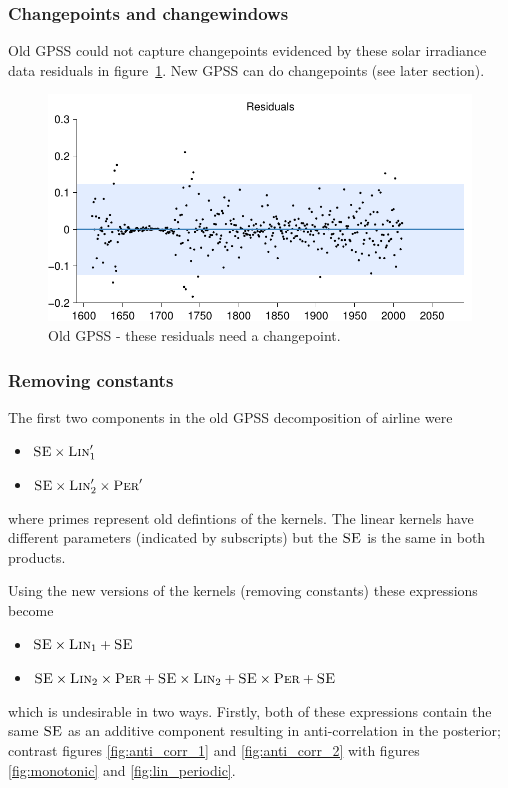 \documentclass{article}
\begin{document}
\subsubsection{Changepoints and changewindows}

Old GPSS could not capture changepoints evidenced by these solar irradiance data residuals in figure~\ref{fig:not_cp}.
New GPSS can do changepoints (see later section).

\begin{figure}[h]
\centering
\includegraphics[width=0.98\columnwidth]{figures/old-gpss/02-solar-s_resid}
\caption{Old GPSS - these residuals need a changepoint.}
\label{fig:not_cp}
\end{figure}

\subsubsection{Removing constants}

The first two components in the old GPSS decomposition of airline were
\begin{itemize}
  \item ${\textsc{SE}} \times {\textsc{Lin}}_1'$
  \item ${\textsc{SE}} \times {\textsc{Lin}}_2' \times {\textsc{Per}}'$
\end{itemize}
where primes represent old defintions of the kernels.
The linear kernels have different parameters (indicated by subscripts) but the ${\textsc{SE}}$ is the same in both products.

Using the new versions of the kernels (removing constants) these expressions become
\begin{itemize}
  \item ${\textsc{SE}} \times {\textsc{Lin}}_1 + {\textsc{SE}}$
  \item ${\textsc{SE}} \times {\textsc{Lin}}_2 \times {\textsc{Per}} + {\textsc{SE}} \times {\textsc{Lin}}_2 +  {\textsc{SE}} \times {\textsc{Per}} + {\textsc{SE}}$
\end{itemize}
which is undesirable in two ways.
Firstly, both of these expressions contain the same ${\textsc{SE}}$ as an additive component resulting in anti-correlation in the posterior; contrast figures \ref{fig:anti_corr_1} and \ref{fig:anti_corr_2} with figures \ref{fig:monotonic} and \ref{fig:lin_periodic}.
\end{document}
